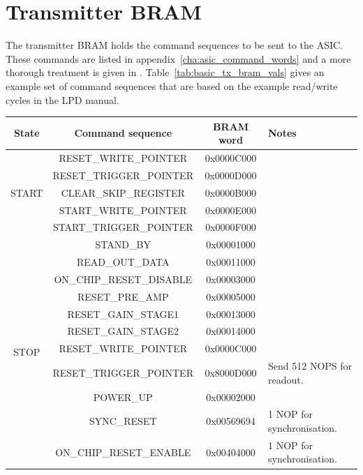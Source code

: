 \documentclass[]{report}
\begin{document}
    \section{Transmitter BRAM} %
    \label{sub:basic_transmitter_bram}
    The transmitter BRAM holds the command sequences to be sent to the ASIC. These commands are listed in appendix~\ref{cha:asic_command_words} and a more thorough treatment is given in \cite{LPD MANUAL}. Table~\ref{tab:basic_tx_bram_vals} gives an example set of command sequences that are based on the example read/write cycles in the LPD manual\cite{LPD MANUAL}.
    \begin{table}
        \begin{center}
        \begin{tabular}{c|c|c|l}
            State & Command sequence & BRAM word & Notes \\
            \hline
            \multirow{5}{*}{START}  
              & RESET\_WRITE\_POINTER   & 0x0000C000 & \\
              & RESET\_TRIGGER\_POINTER & 0x0000D000 & \\
              & CLEAR\_SKIP\_REGISTER   & 0x0000B000 & \\
              & START\_WRITE\_POINTER   & 0x0000E000 & \\
              & START\_TRIGGER\_POINTER & 0x0000F000 & \\
            \hline
            \multirow{12}{*}{STOP} 
              & STAND\_BY                & 0x00001000 & \\
              & READ\_OUT\_DATA          & 0x00011000 & \\
              & ON\_CHIP\_RESET\_DISABLE & 0x00003000 & \\
              & RESET\_PRE\_AMP          & 0x00005000 & \\
              & RESET\_GAIN\_STAGE1      & 0x00013000 & \\
              & RESET\_GAIN\_STAGE2      & 0x00014000 & \\
              & RESET\_WRITE\_POINTER    & 0x0000C000 & \\
              & RESET\_TRIGGER\_POINTER  & 0x8000D000 & Send 512 NOPS for readout. \\
              & POWER\_UP                & 0x00002000 & \\
              & SYNC\_RESET              & 0x00569694 & 1 NOP for synchronisation. \\
              & ON\_CHIP\_RESET\_ENABLE  & 0x00404000 & 1 NOP for synchronisation. \\

\end{tabular}
\end{center}
\end{table}
\end{document}
